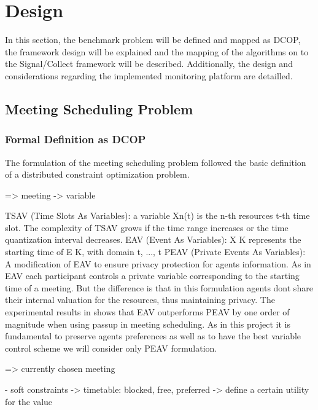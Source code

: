 \chapter{Design}

In this section, the benchmark problem will be defined and mapped as DCOP, the framework design will be explained and the mapping of the algorithms on to the Signal/Collect framework will be described. Additionally, the design and considerations regarding the implemented monitoring platform are detailled.

\section{Meeting Scheduling Problem}

\subsection{Formal Definition as DCOP}

The formulation of the meeting scheduling problem followed the basic definition of a distributed constraint optimization problem.

=> meeting -> variable

\cite{Maheswarana}
TSAV (Time Slots As Variables): a variable Xn(t) is the n-th resources t-th time slot.
 The complexity of TSAV grows if the time range increases or the time quantization interval decreases.
EAV (Event As Variables): X
K represents the starting time of E
K, with domain t, ..., t
PEAV (Private Events As Variables): A modification of EAV to ensure privacy protection for agents information.
As in EAV each participant controls a private variable corresponding to the starting time of a meeting. But the
difference is that in this formulation agents dont share their internal valuation for the resources, thus maintaining
privacy. The experimental results in shows that EAV outperforms PEAV by one order of magnitude when using
passup in meeting scheduling. As in this project it is fundamental to preserve agents preferences as well as to have
the best variable control scheme we will consider only PEAV formulation.

=> currently chosen meeting

- soft constraints -> timetable: blocked, free, preferred -> define a certain utility for the value

